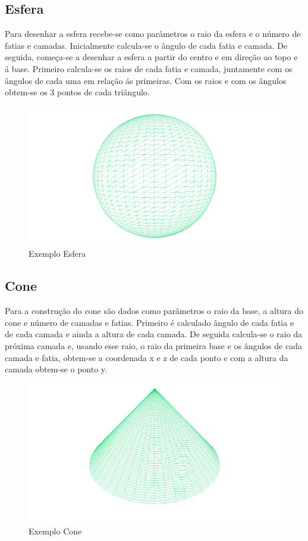 \documentclass{report}
\begin{document}
\subsection{Esfera}
Para desenhar a esfera recebe-se como par\^ametros o raio da esfera e o n\'umero de fatias e camadas. Inicialmente calcula-se o \^angulo de cada fatia e camada. De seguida, come\c{c}a-se a  desenhar a esfera a partir do centro e em dire\c{c}\~ao ao topo e \'a base. Primeiro calcula-se os raios de cada fatia e camada, juntamente com os \^angulos de cada uma em rela\c{c}\~ao \'as primeiras. Com os raios e com os \^angulos obtem-se os 3 pontos de cada tri\^angulo.

\begin{figure}[h]
\centering
\includegraphics[scale=0.15]{esfera.png}
\caption{Exemplo Esfera}
\end{figure}
\clearpage
\subsection{Cone}
Para a constru\c{c}\~ao do cone s\~ao dados como par\^ametros o raio da base, a altura do cone e n\'umero de camadas e fatias. Primeiro \'e calculado \^angulo de cada fatia e de cada camada e ainda a altura de cada camada. De seguida calcula-se o raio da pr\'oxima camada e, usando esse raio, o raio da primeira base e os ângulos de cada camada e fatia, obtem-se a coordenada x e z de cada ponto e com a altura da camada obtem-se o ponto y.

\begin{figure}[h]
\centering
\includegraphics[scale=0.15]{cone.png}
\caption{Exemplo Cone}
\end{figure}
\\
\clearpage
\end{document}
